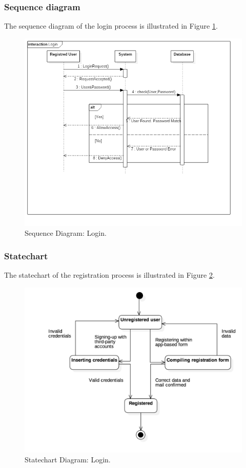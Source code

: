 \subsubsection{Sequence diagram}
The sequence diagram of the login process is illustrated in Figure \ref{fig:SequenceLogin}.
\begin{figure}
	\centering
	\includegraphics[width=6in]{./diagrams/SequenceLogin.png}
	\caption{Sequence Diagram: Login.}
	\label{fig:SequenceLogin}
\end{figure}

\subsubsection{Statechart}
The statechart of the registration process is illustrated in Figure \ref{fig:StatechartLogin}.
\begin{figure}
	\centering
	\includegraphics[width=6in]{./diagrams/StatechartLogin.png}
	\caption{Statechart Diagram: Login.}
	\label{fig:StatechartLogin}
\end{figure}


